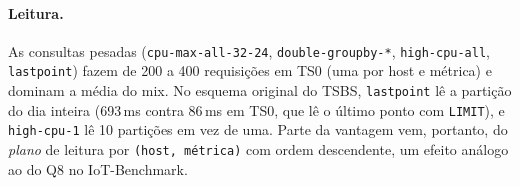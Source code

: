 \paragraph{Leitura.} As consultas pesadas (\texttt{cpu-max-all-32-24}, \texttt{double-groupby-*}, \texttt{high-cpu-all}, \texttt{lastpoint}) fazem de 200 a 400 requisições em TS0 (uma por host e métrica) e dominam a média do mix. No esquema original do TSBS, \texttt{lastpoint} lê a partição do dia inteira (693\,ms contra 86\,ms em TS0, que lê o último ponto com \texttt{LIMIT}), e \texttt{high-cpu-1} lê 10 partições em vez de uma. Parte da vantagem vem, portanto, do \emph{plano} de leitura por \texttt{(host, métrica)} com ordem descendente, um efeito análogo ao do Q8 no IoT-Benchmark.
